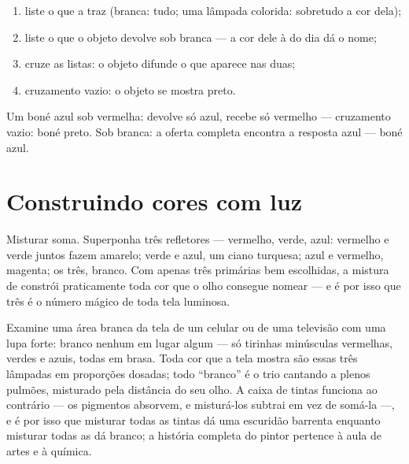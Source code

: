 \begin{method}\label{met:g8:colors-spectra:predict}
\begin{enumerate}
  \item liste o que a  traz (branca: tudo; uma lâmpada colorida:
        sobretudo a cor dela);
  \item liste o que o objeto devolve sob  branca --- a cor dele à
         do dia dá o nome;
  \item cruze as listas: o objeto difunde o que aparece nas duas;
  \item cruzamento vazio: o objeto se mostra preto.
\end{enumerate}
Um boné azul sob  vermelha: devolve só azul, recebe só vermelho ---
cruzamento vazio: boné preto. Sob  branca: a oferta completa
encontra a resposta azul --- boné azul.
\end{method}

\section{Construindo cores com luz}

\begin{example}\label{ex:g8:colors-spectra:additive}
Misturar \emph{} soma. Superponha três refletores --- vermelho,
verde, azul: vermelho e verde juntos fazem amarelo; verde e azul, um
ciano turquesa; azul e vermelho, magenta; os três, branco. Com apenas
três primárias bem escolhidas, a mistura de  constrói
praticamente toda cor que o olho consegue nomear --- e é por isso que
três é o número mágico de toda tela luminosa.
\end{example}

\begin{example}\label{ex:g8:colors-spectra:screen}
Examine uma área branca da tela de um celular ou de uma televisão com
uma lupa forte: branco nenhum em lugar algum --- só tirinhas
minúsculas vermelhas, verdes e azuis, todas em brasa. Toda cor que a
tela mostra são essas três lâmpadas em proporções dosadas; todo
``branco'' é o trio cantando a plenos pulmões, misturado pela
distância do seu olho. A caixa de tintas funciona ao contrário --- os
pigmentos absorvem, e misturá-los subtrai  em vez de somá-la ---, e
é por isso que misturar todas as tintas dá uma escuridão barrenta
enquanto misturar todas as  dá branco; a história completa do
pintor pertence à aula de artes e à química.
\end{example}

